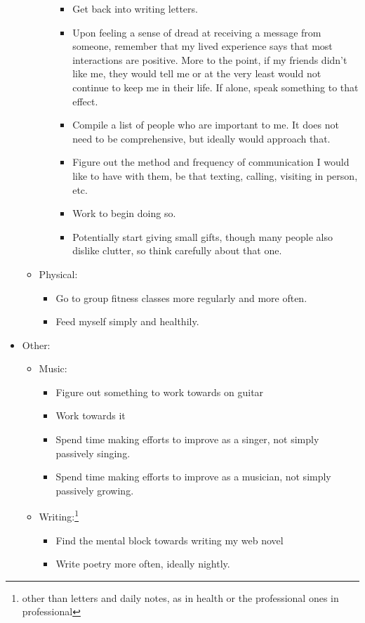 \documentclass[12pt]{article}[titlepage]
\renewcommand{\,}{\textsuperscript{,}}
\begin{document}
\begin{itemize}
\begin{itemize}
\begin{itemize}
\begin{itemize}
\item Get back into writing letters.  
\item Upon feeling a sense of dread at receiving a message from someone, remember that my lived experience says that most interactions are positive. More to the point, if my friends didn't like me, they would tell me or at the very least would not continue to keep me in their life. If alone, speak something to that effect.  
\item Compile a list of people who are important to me. It does not need to be comprehensive, but ideally would approach that.  
\item Figure out the method and frequency of communication I would like to have with them, be that texting, calling, visiting in person, etc.  
\item Work to begin doing so.  
\item Potentially start giving small gifts, though many people also dislike clutter, so think carefully about that one.  
\end{itemize}
\end{itemize}  
\item Physical:  
\begin{itemize}  
\item Go to group fitness classes more regularly and more often.  
\item Feed myself simply and healthily.  
\end{itemize}  
\end{itemize}  
\item Other:  
\begin{itemize}  
\item Music:  
\begin{itemize}  
\item Figure out something to work towards on guitar  
\item Work towards it  
\item Spend time making efforts to improve as a singer, not simply passively singing.  
\item Spend time making efforts to improve as a musician, not simply passively growing.  
\end{itemize}  
\item Writing:\footnote{other than letters and daily notes, as in health or the professional ones in professional}  
\begin{itemize}  
\item Find the mental block towards writing my web novel  
\item Write poetry more often, ideally nightly.  

\end{itemize}
\end{itemize}
\end{itemize}
\end{document}
